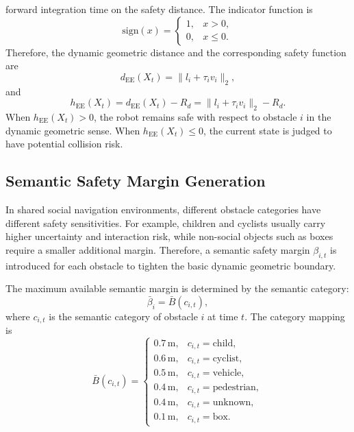 \documentclass[journal]{IEEEtranTIE}
\begin{document}
    forward integration time on the safety distance. The indicator function is
    \begin{equation}
    \mathrm{sign}(x)=
    \begin{cases}
    1, & x>0,\\
    0, & x\le 0.
    \end{cases}
    \end{equation}
    Therefore, the dynamic geometric distance and the corresponding safety
    function are
    \begin{equation}
    d_{\mathrm{EE}}(X_t)=\|l_i+\tau_i v_i\|_2,
    \end{equation}
    and
    \begin{equation}
    h_{\mathrm{EE}}(X_t)
    =d_{\mathrm{EE}}(X_t)-R_d
    =\|l_i+\tau_i v_i\|_2-R_d.
    \end{equation}
    When $h_{\mathrm{EE}}(X_t)>0$, the robot remains safe with respect to
    obstacle $i$ in the dynamic geometric sense. When
    $h_{\mathrm{EE}}(X_t)\le0$, the current state is judged to have potential
    collision risk.

    \subsection{Semantic Safety Margin Generation}
    In shared social navigation environments, different obstacle categories have
    different safety sensitivities. For example, children and cyclists usually
    carry higher uncertainty and interaction risk, while non-social objects such
    as boxes require a smaller additional margin. Therefore, a semantic safety
    margin $\beta_{i,t}$ is introduced for each obstacle to tighten the basic
    dynamic geometric boundary.

    The maximum available semantic margin is determined by the semantic category:
    \begin{equation}
    \bar{\beta}_i=\bar{B}(c_{i,t}),
    \end{equation}
    where $c_{i,t}$ is the semantic category of obstacle $i$ at time $t$. The
    category mapping is
    \begin{equation}
    \bar{B}(c_{i,t})=
    \begin{cases}
    0.7\,\mathrm{m}, & c_{i,t}=\mathrm{child},\\
    0.6\,\mathrm{m}, & c_{i,t}=\mathrm{cyclist},\\
    0.5\,\mathrm{m}, & c_{i,t}=\mathrm{vehicle},\\
    0.4\,\mathrm{m}, & c_{i,t}=\mathrm{pedestrian},\\
    0.4\,\mathrm{m}, & c_{i,t}=\mathrm{unknown},\\
    0.1\,\mathrm{m}, & c_{i,t}=\mathrm{box}.
    \end{cases}
    \end{equation}
\end{document}
